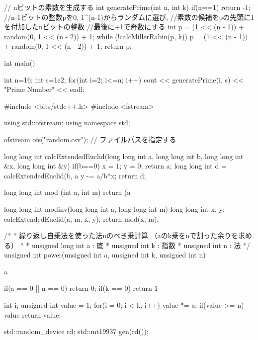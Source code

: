 \documentclass[xelatex, 11pt, a4paper, ja=standard]{bxjsarticle}
\begin{document}
\begin{mylisting}[language=c++,caption=演習課題7のソースコード]
// nビットの素数を生成する
int generatePrime(int n, int k) {
    if(n==1) return -1;
    //n-1ビットの整数pを{0, 1}^(n-1)からランダムに選び, 
    //素数の候補をpの先頭に1を付加したnビットの整数
    //最後に+1で奇数にする
    int p = (1 << (n - 1)) + random(0, 1 << (n - 2)) + 1; 
    while (!calcMillerRabin(p, k)) {
        p = (1 << (n - 1)) + random(0, 1 << (n - 2)) + 1;
    }
    return p;
}



int main(){

    int n=16;
    int s=1e2;
    for(int i=2; i<=n; i++){
      cout << generatePrime(i, s) << "\tis Prime Number" << endl;
    }


}

\end{mylisting}

\begin{mylisting}[language=c++,caption=演習課題8のソースコード]
    #include <bits/stdc++.h>
#include <fstream>

using std::ofstream;
using namespace std;

ofstream ofs("random.csv");  // ファイルパスを指定する

long long int calcExtendedEuclid(long long int a, long long int b,
                                long long int &x, long long int &y){  
    if(b==0){
        x = 1;
        y = 0;
        return a;
    }
    long long int d = calcExtendedEuclid(b, a%
    y -= a/b*x;
    return d;
}

long long int mod (int a, int m){
    return (a%
}

long long int modinv(long long int a, long long int m){
    long long int x, y;
    calcExtendedEuclid(a, m, x, y);
    return mod(x, m);
}

/*
 * 繰り返し自乗法を使った法nのべき乗計算
 （aのk乗をnで割った余りを求める）
 * 
 * unsigned long int a : 底
 * unsigned int k : 指数
 * unsigned int n : 法
*/
unsigned int power(unsigned int a, unsigned int k, 
                                        unsigned int n) {

    a %

    if(a == 0 || n == 0){
        return 0;
    }
    if(k == 0){
        return 1 %
    }

    int i;
    unsigned int value = 1;
    for(i = 0; i < k; i++) {
        value *= a;
        if(value >= n) {
            value %
        }
    }
    return value;
}

std::random_device rd;
std::mt19937 gen(rd());


\end{mylisting}
\end{document}
